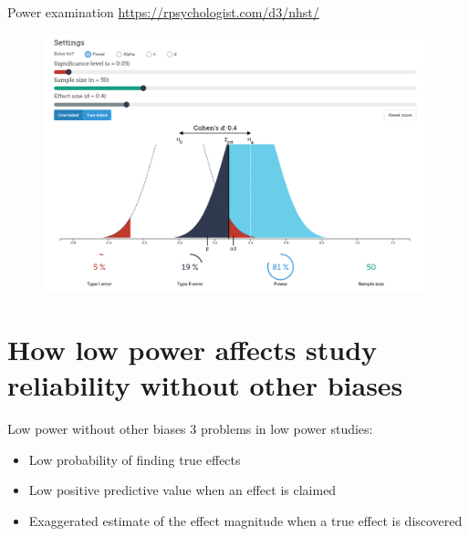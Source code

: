 \documentclass{beamer}
\begin{document}
    \begin{frame}{Power examination}
    \href{https://rpsychologist.com/d3/nhst/}{https://rpsychologist.com/d3/nhst/}
    
    \begin{figure}[H]
    	\centering
    	\includegraphics[width=1\textwidth]{pics/power demo.png}
    \end{figure}
	\end{frame}
	
    \section{How low power affects study reliability without other biases}
	
	\begin{frame}{Low power without other biases}
		3 problems in low power studies:
		\begin{itemize}
			\item Low probability of finding true effects 
			\item Low positive predictive value when an effect is claimed
			\item Exaggerated estimate of the effect magnitude when a true effect is discovered
		\end{itemize}
	\end{frame}
	
\end{document}
